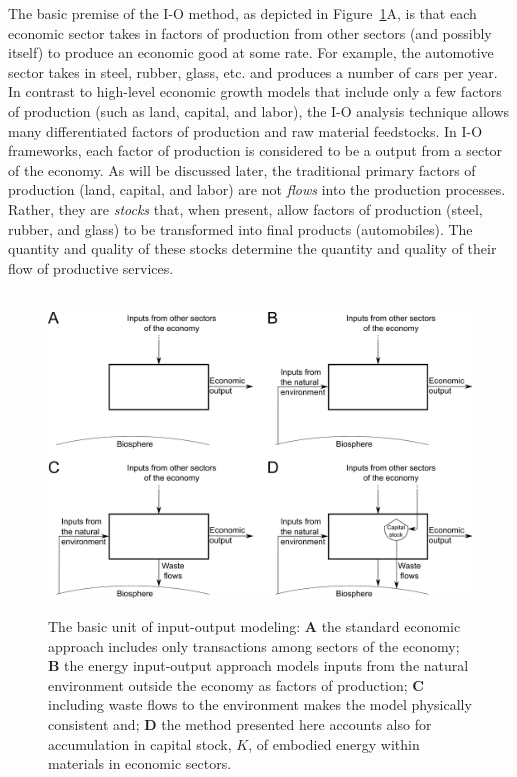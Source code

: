 The basic premise of the I-O method, 
as depicted in Figure~\ref{fig:basic_unit}A, 
is that each economic sector takes in factors of production 
from other sectors (and possibly itself) 
to produce an economic good at some rate. 
For example, the automotive sector takes in steel, rubber, glass, etc. 
and produces a number of cars per year. 
In contrast to high-level economic growth models 
that include only a few factors of production (such as land, capital, and labor), 
the I-O analysis technique allows many differentiated factors of production 
and raw material feedstocks.\cite{Costanza:1980ww} 
In I-O frameworks, each factor of production 
is considered to be a output from a sector of the economy. 
As will be discussed later,
the traditional primary factors of production (land, capital, and labor) 
are not \emph{flows} into the production processes. 
Rather, they are \emph{stocks} that, when present, 
allow factors of production (steel, rubber, and glass) 
to be transformed into final products (automobiles). 
The quantity and quality of these stocks 
determine the quantity and quality of their flow of productive services.

\begin{figure}[!ht]
\centering\
\includegraphics[width=\linewidth]{Part_0/Chapter_Introduction/images/Basic_unit_square.pdf}
\caption[The basic unit of input-output modeling]{The basic unit 
of input-output modeling: 
\textbf{A} the standard economic approach includes only transactions 
among sectors of the economy; 
\textbf{B} the energy input-output approach models inputs 
from the natural environment outside the economy as factors of production; 
\textbf{C} including waste flows to the environment makes the model physically consistent and;
\textbf{D} the method presented here accounts also for accumulation
in capital stock, $K$, of embodied energy within materials in economic sectors. 
}
\label{fig:basic_unit}
\end{figure}


